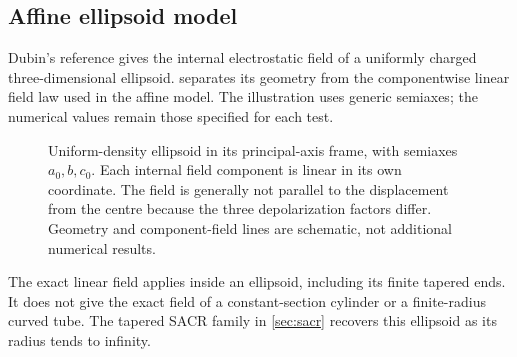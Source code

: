 \documentclass[10pt,a4paper]{article}
\begin{document}
\subsection{Affine ellipsoid model}
Dubin's reference gives the internal electrostatic field of a uniformly
charged three-dimensional ellipsoid.  separates
its geometry from the componentwise linear field law used in the affine
model. The illustration uses generic semiaxes; the numerical values remain
those specified for each test.
\begin{figure}[H]
 \centering
 
 \caption{Uniform-density ellipsoid in its principal-axis frame, with
 semiaxes $a_0,b,c_0$. Each internal field component is linear in its own
 coordinate. The field is generally not parallel to the displacement from
 the centre because the three depolarization factors differ. Geometry and
 component-field lines are schematic, not additional numerical results.}
 \label{fig:dubin-reference}
\end{figure}
The exact linear field applies inside an ellipsoid, including its finite
tapered ends. It does not give the exact field of a constant-section cylinder
or a finite-radius curved tube. The tapered SACR family in \cref{sec:sacr}
recovers this ellipsoid as its radius tends to infinity.
\end{document}
